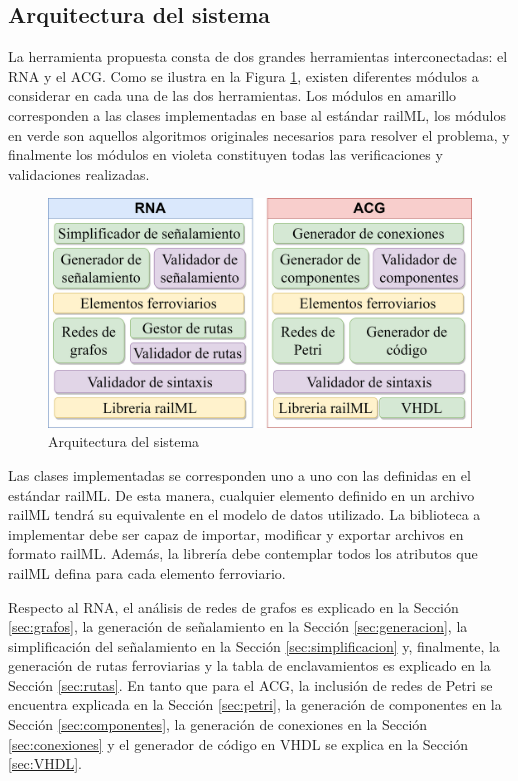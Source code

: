 \subsection{Arquitectura del sistema}

    La herramienta propuesta consta de dos grandes herramientas interconectadas: el RNA y el ACG. Como se ilustra en la Figura \ref{fig:architecture}, existen diferentes módulos a considerar en cada una de las dos herramientas. Los módulos en amarillo corresponden a las clases implementadas en base al estándar railML, los módulos en verde son aquellos algoritmos originales necesarios para resolver el problema, y finalmente los módulos en violeta constituyen todas las verificaciones y validaciones realizadas.

    \begin{figure}[h]
        \centering
        \includegraphics[width=1\textwidth]{Figuras/Architecture.png}
        \centering\caption{Arquitectura del sistema}
        \label{fig:architecture}
    \end{figure}

    Las clases implementadas se corresponden uno a uno con las definidas en el estándar railML. De esta manera, cualquier elemento definido en un archivo railML tendrá su equivalente en el modelo de datos utilizado. La biblioteca a implementar debe ser capaz de importar, modificar y exportar archivos en formato railML. Además, la librería debe contemplar todos los atributos que railML defina para cada elemento ferroviario.

    Respecto al RNA, el análisis de redes de grafos es explicado en la Sección \ref{sec:grafos}, la generación de señalamiento en la Sección \ref{sec:generacion}, la simplificación del señalamiento en la Sección \ref{sec:simplificacion} y, finalmente, la generación de rutas ferroviarias y la tabla de enclavamientos es explicado en la Sección \ref{sec:rutas}. En tanto que para el ACG, la inclusión de redes de Petri se encuentra explicada en la Sección \ref{sec:petri}, la generación de componentes en la Sección \ref{sec:componentes}, la generación de conexiones en la Sección \ref{sec:conexiones} y el generador de código en VHDL se explica en la Sección \ref{sec:VHDL}.